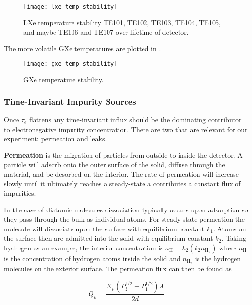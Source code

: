 \begin{figure}
\centering
\texttt{[image: lxe\_temp\_stability]}
\caption{LXe temperature stability TE101, TE102, TE103, TE104, TE105, and maybe TE106 and TE107 over lifetime of detector.}
\label{fig:electron_lifetime_model_outgassing_lxe_temp}
\end{figure}

The more volatile GXe temperatures are plotted in .

\begin{figure}
\centering
\texttt{[image: gxe\_temp\_stability]}
\caption{GXe temperature stability.}
\label{fig:electron_lifetime_model_outgassing_gxe_temp}
\end{figure}



\subsubsection{Time-Invariant Impurity Sources}
\label{subsubsec:electron_lifetime_model_outgassing_leak_sources}
Once $\tau_e$ flattens any time-invariant influx should be the dominating contributor to electronegative impurity concentration.  There
are two that are relevant for our experiment: permeation and leaks.

\textbf{Permeation} is the migration of particles from outside to inside the detector.  A particle will adsorb onto the outer surface of
the solid, diffuse through the material, and be desorbed on the interior.  The rate of permeation will increase slowly until it ultimately
reaches a steady-state a contributes a constant flux of impurities.

In the case of diatomic molecules dissociation typically occurs
upon adsorption so they pass through the bulk as individual atoms.  For steady-state permeation the molecule will dissociate upon the
surface with equilibrium constant $k_1$.  Atoms on the surface then are admitted into the solid with equilibrium constant $k_2$.  Taking
hydrogen as an example, the
interior concentration is $n_{\mathrm{H}} = k_2 (k_2 n_{\mathrm{H_2}})$ where $n_{\mathrm{H}}$ is the concentration of hydrogen atoms
inside the solid and $n_{\mathrm{H_2}}$ is the hydrogen molecules on the exterior surface.  The permeation flux can then be found as

\begin{equation}
Q_k = \frac{K_p (P_2^{1/2} - P_1^{1/2})A}{2d}
\label{eq:electron_lifetime_model_outgassing_leak_sources_perm}
\end{equation}

